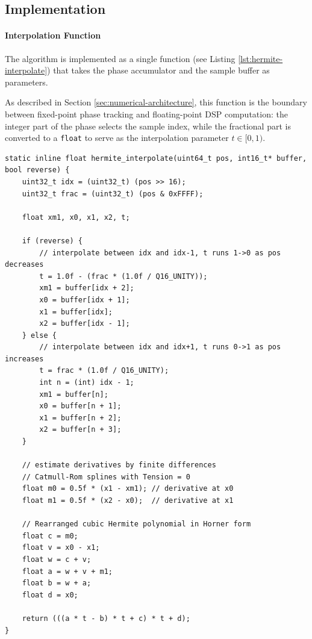 \subsection{Implementation}


\paragraph{Interpolation Function}

The algorithm is implemented as a single function (see Listing \ref{lst:hermite-interpolate}) that takes the phase accumulator 
and the sample buffer as parameters. 

As described in Section \ref{sec:numerical-architecture}, this function is the boundary between fixed-point  phase tracking and floating-point DSP computation: 
the integer part of the phase selects the sample index, while the fractional part is converted to a \texttt{float} to serve as the interpolation parameter $t \in [0, 1)$.

\begin{listing}[H]
\begin{verbatim}
static inline float hermite_interpolate(uint64_t pos, int16_t* buffer, bool reverse) {
	uint32_t idx = (uint32_t) (pos >> 16);
	uint32_t frac = (uint32_t) (pos & 0xFFFF);
	
	float xm1, x0, x1, x2, t;
	
	if (reverse) {
		// interpolate between idx and idx-1, t runs 1->0 as pos decreases
		t = 1.0f - (frac * (1.0f / Q16_UNITY));
		xm1 = buffer[idx + 2];
		x0 = buffer[idx + 1];
		x1 = buffer[idx];
		x2 = buffer[idx - 1];
	} else {
		// interpolate between idx and idx+1, t runs 0->1 as pos increases
		t = frac * (1.0f / Q16_UNITY);
		int n = (int) idx - 1;
		xm1 = buffer[n];
		x0 = buffer[n + 1];
		x1 = buffer[n + 2];
		x2 = buffer[n + 3];
	}
	
	// estimate derivatives by finite differences
	// Catmull-Rom splines with Tension = 0
	float m0 = 0.5f * (x1 - xm1); // derivative at x0
	float m1 = 0.5f * (x2 - x0);  // derivative at x1
	
	// Rearranged cubic Hermite polynomial in Horner form
	float c = m0;
	float v = x0 - x1;
	float w = c + v;
	float a = w + v + m1;
	float b = w + a;
	float d = x0;
	
	return (((a * t - b) * t + c) * t + d);
}
\end{verbatim}

\caption{Hermite interpolation based on Laurent de Soras' implementation from \\
		\url{https://www.musicdsp.org/en/latest/Other/93-hermite-interpollation.html}}
\label{lst:hermite-interpolate}
\end{listing}



